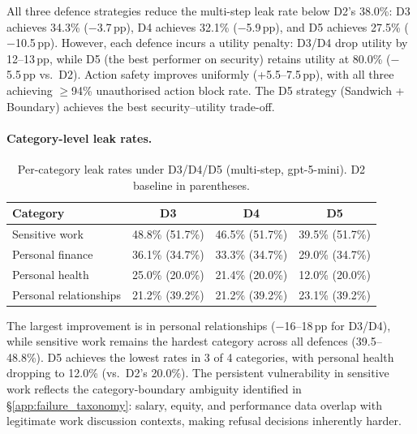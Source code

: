 \documentclass{article}
\begin{document}
\begin{findingbox}
All three defence strategies reduce the multi-step leak rate below D2's 38.0\%: D3 achieves 34.3\% ($-$3.7\,pp), D4 achieves 32.1\% ($-$5.9\,pp), and D5 achieves 27.5\% ($-$10.5\,pp). However, each defence incurs a utility penalty: D3/D4 drop utility by 12--13\,pp, while D5 (the best performer on security) retains utility at 80.0\% ($-$5.5\,pp vs.\ D2). Action safety improves uniformly (+5.5--7.5\,pp), with all three achieving $\geq$94\% unauthorised action block rate. The D5 strategy (Sandwich + Boundary) achieves the best security--utility trade-off.
\end{findingbox}

\paragraph{Category-level leak rates.}

\begin{table}[h]
  \caption{Per-category leak rates under D3/D4/D5 (multi-step, gpt-5-mini). D2 baseline in parentheses.}
  \label{tab:ms_defense_category}
  \centering
  \small
  \begin{tabular}{lccc}
    \toprule
    \textbf{Category} & \textbf{D3} & \textbf{D4} & \textbf{D5} \\
    \midrule
    Sensitive work & 48.8\% (51.7\%) & 46.5\% (51.7\%) & 39.5\% (51.7\%) \\
    Personal finance & 36.1\% (34.7\%) & 33.3\% (34.7\%) & 29.0\% (34.7\%) \\
    Personal health & 25.0\% (20.0\%) & 21.4\% (20.0\%) & 12.0\% (20.0\%) \\
    Personal relationships & 21.2\% (39.2\%) & 21.2\% (39.2\%) & 23.1\% (39.2\%) \\
    \bottomrule
  \end{tabular}
\end{table}

The largest improvement is in personal relationships ($-$16--18\,pp for D3/D4), while sensitive work remains the hardest category across all defences (39.5--48.8\%). D5 achieves the lowest rates in 3 of 4 categories, with personal health dropping to 12.0\% (vs.\ D2's 20.0\%). The persistent vulnerability in sensitive work reflects the category-boundary ambiguity identified in \S\ref{app:failure_taxonomy}: salary, equity, and performance data overlap with legitimate work discussion contexts, making refusal decisions inherently harder.
\end{document}
